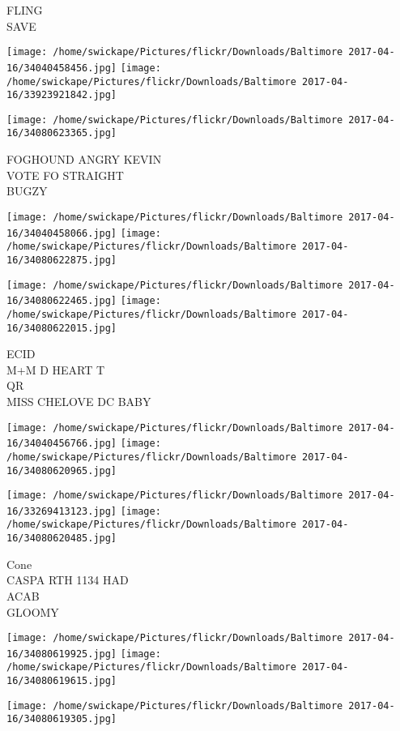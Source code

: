 \documentclass[10pt,letterpaper]{article}
\begin{document}
FLING\\
SAVE
\pagebreak

\texttt{[image: /home/swickape/Pictures/flickr/Downloads/Baltimore 2017-04-16/34040458456.jpg]}
\texttt{[image: /home/swickape/Pictures/flickr/Downloads/Baltimore 2017-04-16/33923921842.jpg]}

\vspace{0.25in}
\texttt{[image: /home/swickape/Pictures/flickr/Downloads/Baltimore 2017-04-16/34080623365.jpg]}

FOGHOUND ANGRY KEVIN\\
VOTE FO STRAIGHT\\
BUGZY
\pagebreak

\texttt{[image: /home/swickape/Pictures/flickr/Downloads/Baltimore 2017-04-16/34040458066.jpg]}
\texttt{[image: /home/swickape/Pictures/flickr/Downloads/Baltimore 2017-04-16/34080622875.jpg]}

\texttt{[image: /home/swickape/Pictures/flickr/Downloads/Baltimore 2017-04-16/34080622465.jpg]}
\texttt{[image: /home/swickape/Pictures/flickr/Downloads/Baltimore 2017-04-16/34080622015.jpg]}

ECID\\
M+M D HEART T\\
QR\\
MISS CHELOVE DC BABY
\pagebreak

\texttt{[image: /home/swickape/Pictures/flickr/Downloads/Baltimore 2017-04-16/34040456766.jpg]}
\texttt{[image: /home/swickape/Pictures/flickr/Downloads/Baltimore 2017-04-16/34080620965.jpg]}

\texttt{[image: /home/swickape/Pictures/flickr/Downloads/Baltimore 2017-04-16/33269413123.jpg]}
\texttt{[image: /home/swickape/Pictures/flickr/Downloads/Baltimore 2017-04-16/34080620485.jpg]}

Cone\\
CASPA RTH 1134 HAD\\
ACAB\\
GLOOMY
\pagebreak

\texttt{[image: /home/swickape/Pictures/flickr/Downloads/Baltimore 2017-04-16/34080619925.jpg]}
\texttt{[image: /home/swickape/Pictures/flickr/Downloads/Baltimore 2017-04-16/34080619615.jpg]}

\texttt{[image: /home/swickape/Pictures/flickr/Downloads/Baltimore 2017-04-16/34080619305.jpg]}
\end{document}
